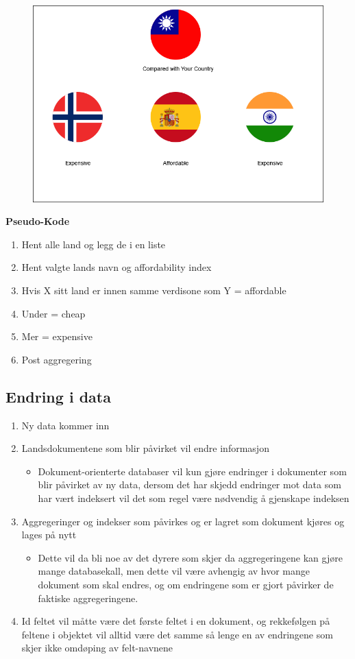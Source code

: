 \FigureCounter
\begin{figure}[H]
  \includegraphics[scale=0.5]{images/milepael3/countriesComparedByExpensiveness.png}
\end{figure}

\textbf{Pseudo-Kode}
\begin{enumerate}
  \item Hent alle land og legg de i en liste
  \item Hent valgte lands navn og affordability index
  \item Hvis X sitt land er innen samme verdisone som Y = affordable
  \item Under = cheap
  \item Mer = expensive
  \item Post aggregering
\end{enumerate}

\subsection{Endring i data}
\begin{enumerate}
  \item Ny data kommer inn
  \item Landsdokumentene som blir påvirket vil endre informasjon
  \begin{itemize}
    \item Dokument-orienterte databaser vil kun gjøre endringer i dokumenter som blir påvirket av ny data, dersom det har skjedd endringer mot data som har vært indeksert vil det som regel være nødvendig å gjenskape indeksen
  \end{itemize}
  \item Aggregeringer og indekser som påvirkes og er lagret som dokument kjøres og lages på nytt
  \begin{itemize}
    \item Dette vil da bli noe av det dyrere som skjer da aggregeringene kan gjøre mange databasekall, men dette vil være avhengig av hvor mange dokument som skal endres, og om endringene som er gjort påvirker de faktiske aggregeringene.
  \end{itemize}
  \item Id feltet vil måtte være det første feltet i en dokument, og rekkefølgen på feltene i objektet vil alltid være det samme så lenge en av endringene som skjer ikke omdøping av felt-navnene 
\end{enumerate}